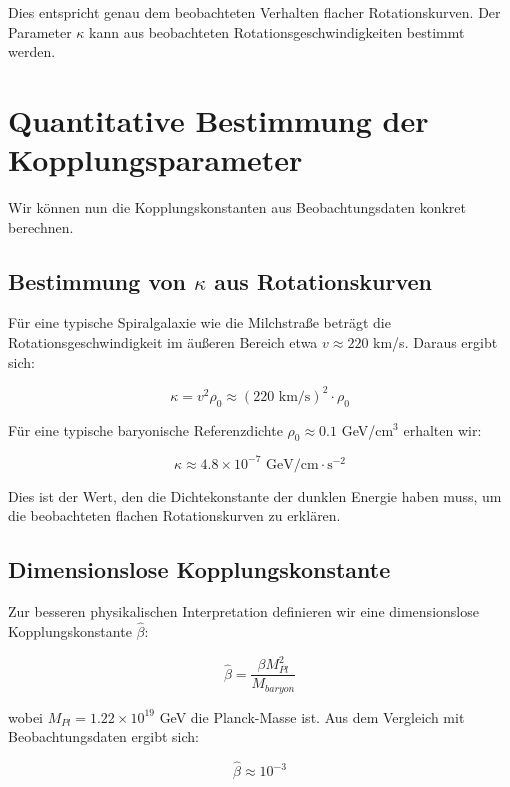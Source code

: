 \documentclass[a4paper,12pt]{article}
\begin{document}
	Dies entspricht genau dem beobachteten Verhalten flacher Rotationskurven. Der Parameter $\kappa$ kann aus beobachteten Rotationsgeschwindigkeiten bestimmt werden.
	
	\section{Quantitative Bestimmung der Kopplungsparameter}
	
	Wir können nun die Kopplungskonstanten aus Beobachtungsdaten konkret berechnen.
	
	\subsection{Bestimmung von $\kappa$ aus Rotationskurven}
	
	Für eine typische Spiralgalaxie wie die Milchstraße beträgt die Rotationsgeschwindigkeit im äußeren Bereich etwa $v \approx 220$ km/s. Daraus ergibt sich:
	
	\begin{equation}
		\kappa = v^2 \rho_0 \approx (220 \text{ km/s})^2 \cdot \rho_0
	\end{equation}
	
	Für eine typische baryonische Referenzdichte $\rho_0 \approx 0.1$ GeV/cm$^3$ erhalten wir:
	
	\begin{equation}
		\kappa \approx 4.8 \times 10^{-7} \text{ GeV/cm} \cdot \text{s}^{-2}
	\end{equation}
	
	Dies ist der Wert, den die Dichtekonstante der dunklen Energie haben muss, um die beobachteten flachen Rotationskurven zu erklären.
	
	\subsection{Dimensionslose Kopplungskonstante}
	
	Zur besseren physikalischen Interpretation definieren wir eine dimensionslose Kopplungskonstante $\hat{\beta}$:
	
	\begin{equation}
		\hat{\beta} = \frac{\beta M_{Pl}^2}{M_{baryon}}
	\end{equation}
	
	wobei $M_{Pl} = 1.22 \times 10^{19}$ GeV die Planck-Masse ist. Aus dem Vergleich mit Beobachtungsdaten ergibt sich:
	
	\begin{equation}
		\hat{\beta} \approx 10^{-3}
	\end{equation}
	
\end{document}
